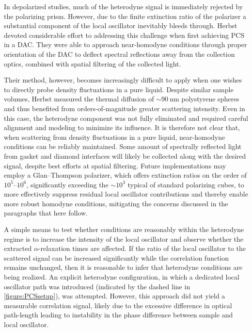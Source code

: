 In depolarized studies, much of the heterodyne signal is immediately rejected by the polarizing prism. However, due to the finite extinction ratio of the polarizer a substantial component of the local oscillator inevitably bleeds through. Herbst \etal devoted considerable effort to addressing this challenge when first achieving PCS in a DAC\nolinebreak\cite{Herbst}. They were able to approach near-homodyne conditions through proper orientation of the DAC to deflect spectral reflections away from the collection optics, combined with spatial filtering of the collected light.

Their method, however, becomes increasingly difficult to apply when one wishes to directly probe density fluctuations in a pure liquid. Despite similar sample volumes, Herbst \etal measured the thermal diffusion of $\sim 90~\si{\nano\meter}$ polystyrene spheres and thus benefited from orders-of-magnitude greater scattering intensity. Even in this case, the heterodyne component was not fully eliminated and required careful alignment and modeling to minimize its influence. It is therefore not clear that, when scattering from density fluctuations in a pure liquid, near-homodyne conditions can be reliably maintained. Some amount of spectrally reflected light from gasket and diamond interfaces will likely be collected along with the desired signal, despite best efforts at spatial filtering. Future implementations may employ a Glan--Thompson polarizer, which offers extinction ratios on the order of $10^{5}$--$10^{6}$, significantly exceeding the $\sim 10^{3}$ typical of standard polarizing cubes, to more effectively suppress residual local oscillator contributions and thereby enable more robust homodyne conditions, mitigating the concerns discussed in the paragraphs that here follow.

A simple means to test whether conditions are reasonably within the heterodyne regime is to increase the intensity of the local oscillator and observe whether the extracted $\alpha$-relaxation times are affected. If the ratio of the local oscillator to the scattered signal can be increased significantly while the correlation function remains unchanged, then it is reasonable to infer that heterodyne conditions are being realized. An explicit heterodyne configuration, in which a dedicated local oscillator path was introduced (indicated by the dashed line in \fig\ref{figure:PCSsetup}), was attempted. However, this approach did not yield a measurable correlation signal, likely due to the excessive difference in optical path-length leading to instability in the phase difference between sample and local oscillator. 


